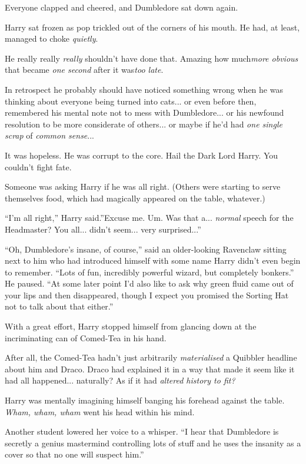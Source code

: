 Everyone clapped and cheered, and Dumbledore sat down again.

Harry sat frozen as pop trickled out of the corners of his mouth. He
had, at least, managed to choke \emph{quietly}.

He really really \emph{really} shouldn't have done that. Amazing how
much\emph{more obvious} that became \emph{one second} after it
was\emph{too late}.

In retrospect he probably should have noticed something wrong when he
was thinking about everyone being turned into cats... or even
before then, remembered his mental note not to mess with
Dumbledore... or his newfound resolution to be more considerate of
others... or maybe if he'd had \emph{one single scrap} of
\emph{common sense}...

It was hopeless. He was corrupt to the core. Hail the Dark Lord Harry.
You couldn't fight fate.

Someone was asking Harry if he was all right. (Others were starting to
serve themselves food, which had magically appeared on the table,
whatever.)

``I'm all right,'' Harry said.''Excuse me. Um. Was that a...
\emph{normal} speech for the Headmaster? You all... didn't
seem... very surprised...''

``Oh, Dumbledore's insane, of course,'' said an older-looking Ravenclaw
sitting next to him who had introduced himself with some name Harry
didn't even begin to remember. ``Lots of fun, incredibly powerful
wizard, but completely bonkers.'' He paused. ``At some later point I'd
also like to ask why green fluid came out of your lips and then
disappeared, though I expect you promised the Sorting Hat not to talk
about that either.''

With a great effort, Harry stopped himself from glancing down at the
incriminating can of Comed-Tea in his hand.

After all, the Comed-Tea hadn't just arbitrarily \emph{materialised} a
Quibbler headline about him and Draco. Draco had explained it in a way
that made it seem like it had all happened... naturally? As if it
had \emph{altered history to fit?}

Harry was mentally imagining himself banging his forehead against the
table. \emph{Wham, wham, wham} went his head within his mind.

Another student lowered her voice to a whisper. ``I hear that Dumbledore
is secretly a genius mastermind controlling lots of stuff and he uses
the insanity as a cover so that no one will suspect him.''

